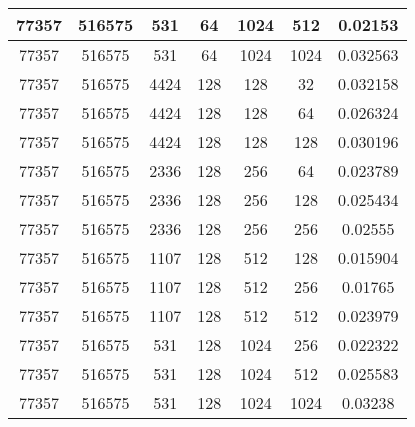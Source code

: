 \documentclass[9pt]{article}
\begin{document}
\begin{tabular}{|c|c|c|c|c|c|c| }
\hline
77357  & 516575  & 531  & 64  & 1024  & 512  & 0.02153 \\
\hline
77357  & 516575  & 531  & 64  & 1024  & 1024  & 0.032563 \\
\hline
77357  & 516575  & 4424  & 128  & 128  & 32  & 0.032158 \\
\hline
77357  & 516575  & 4424  & 128  & 128  & 64  & 0.026324 \\
\hline
77357  & 516575  & 4424  & 128  & 128  & 128  & 0.030196 \\
\hline
77357  & 516575  & 2336  & 128  & 256  & 64  & 0.023789 \\
\hline
77357  & 516575  & 2336  & 128  & 256  & 128  & 0.025434 \\
\hline
77357  & 516575  & 2336  & 128  & 256  & 256  & 0.02555 \\
\hline
77357  & 516575  & 1107  & 128  & 512  & 128  & 0.015904 \\
\hline
77357  & 516575  & 1107  & 128  & 512  & 256  & 0.01765 \\
\hline
77357  & 516575  & 1107  & 128  & 512  & 512  & 0.023979 \\
\hline
77357  & 516575  & 531  & 128  & 1024  & 256  & 0.022322 \\
\hline
77357  & 516575  & 531  & 128  & 1024  & 512  & 0.025583 \\
\hline
77357  & 516575  & 531  & 128  & 1024  & 1024  & 0.03238 \\
\hline
\end{tabular}
 
\end{document}
